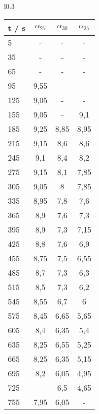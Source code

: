 \begin{wraptable}{l}{0.3\linewidth}
	\begin{tabular}{l|ccc}
		\hline
		t / s & $\alpha_{25}$ & $\alpha_{30}$ & $\alpha_{35}$\\
		\hline
		\hline
5       & -               & -               & -\\
35      & -               & -               & -\\
65      & -               & -               & -\\
95      & 9,55            & -               & -\\
125     & 9,05            & -               & -\\
155     & 9,05            & -               & 9,1\\
185     & 9,25            & 8,85            & 8,95\\
215     & 9,15            & 8,6             & 8,6\\
245     & 9,1             & 8,4             & 8,2\\
275     & 9,15            & 8,1             & 7,85\\
305     & 9,05            & 8               & 7,85\\
335     & 8,95            & 7,8             & 7,6\\
365     & 8,9             & 7,6             & 7,3\\
395     & 8,9             & 7,3             & 7,15\\
425     & 8,8             & 7,6             & 6,9\\
455     & 8,75            & 7,5             & 6,55\\
485     & 8,7             & 7,3             & 6,3\\
515     & 8,5             & 7,3             & 6,2\\
545     & 8,55            & 6,7             & 6\\
575     & 8,45            & 6,65            & 5,65\\
605     & 8,4             & 6,35            & 5,4\\
635     & 8,25            & 6,55            & 5,25\\
665     & 8,25            & 6,35            & 5,15\\
695     & 8,2             & 6,05            & 4,95\\
725     & -               & 6,5             & 4,65\\
755     & 7,95            & 6,05            & -\\

\end{tabular}
\end{wraptable}
